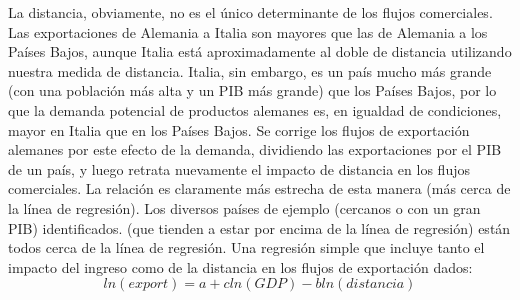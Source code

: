 \begin{multicols}{2}
   La distancia, obviamente, no es el único determinante de los flujos comerciales. Las exportaciones de Alemania a Italia son mayores que las de Alemania a los Países Bajos, aunque Italia está aproximadamente al doble de distancia utilizando nuestra medida de distancia. Italia, sin embargo, es un país mucho más grande (con una población más alta y un PIB más grande) que los Países Bajos, por lo que la demanda potencial de productos alemanes es, en igualdad de condiciones, mayor en Italia que en los Países Bajos.  Se corrige los flujos de exportación alemanes por este efecto de la demanda, dividiendo las exportaciones por el PIB de un país, y luego retrata nuevamente el impacto de distancia en los flujos comerciales. La relación es claramente más estrecha de esta manera (más cerca de la línea de regresión). Los diversos países de ejemplo (cercanos o con un gran PIB) identificados. (que tienden a estar por encima de la línea de regresión) están todos cerca de la línea de regresión. Una regresión simple que incluye tanto el impacto del ingreso como de la distancia en los flujos de exportación dados:
   $$ln(export) = a + c ln(GDP) - b ln(distancia)$$


\end{multicols}
